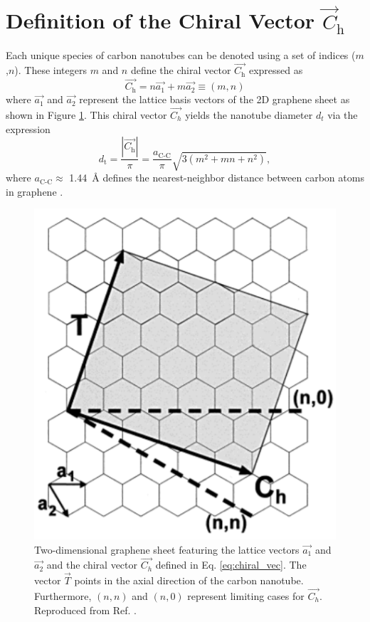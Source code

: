 \section{Definition of the Chiral Vector $\vec{C}_\text{h}$}

Each unique species of carbon nanotubes can be denoted using a set of indices ($m$,$n$). These integers $m$ and $n$ define the chiral vector $\vec{C_\text{h} }$ expressed as
\begin{equation}
	\vec{C_\text{h}} = n {\vec{a_\text{1}}} + m {\vec{a_2}} \equiv (m,n)
	\label{eq:chiral_vec}
\end{equation}
where $\vec{a_\text{1}}$ and $\vec{a_\text{2}}$ represent the lattice basis vectors of the 2D graphene sheet as shown in Figure \ref{fig:chiral_vectors}. This chiral vector $\vec{C_h}$ yields the nanotube diameter $d_t$ via the expression
\begin{equation}
	d_\text{t} = \dfrac{|\vec{C_\text{h}}|}{\pi} = \dfrac{a_\text{C-C}}{\pi}\sqrt{3(m^2 + mn + n^2)},
\end{equation}
where $a_\text{C-C} \approx$ \SI{1.44}{\angstrom} defines the nearest-neighbor distance between carbon atoms in graphene \cite{nanot2013single}.

\begin{figure}[ht]
	\centering
	\includegraphics[scale=1]{images/chapter_optical_props/chiral_vectors_sheet.png}
	\caption{Two-dimensional graphene sheet featuring the lattice vectors $\vec{a_1}$ and $\vec{a_2}$ and the chiral vector $\vec{C_h}$ defined in Eq. \ref{eq:chiral_vec}. The vector $\vec{T}$ points in the axial direction of the carbon nanotube. Furthermore, $(n,n)$ and $(n,0)$ represent limiting cases for $\vec{C_h }$. Reproduced from Ref. \cite{odom2000structure}.}
	\label{fig:chiral_vectors}
\end{figure}



